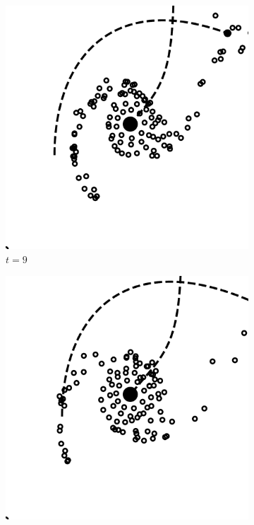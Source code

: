 \documentclass[11pt,twocolumn]{article}
\begin{document}
\begin{figure}[!htbp]
            \begin{subfigure}[b]{0.2\textwidth}
    			\includegraphics[width=\textwidth]{fig_4/Fig4_9_000000_0.pdf}
    				\caption{$t = 9$}
  			\end{subfigure}
            \hfill
            \begin{subfigure}[b]{0.2\textwidth}
    			\includegraphics[width=\textwidth]{fig_4/Fig4_10_000000_0.pdf}

\end{subfigure}
\end{figure}
\end{document}

